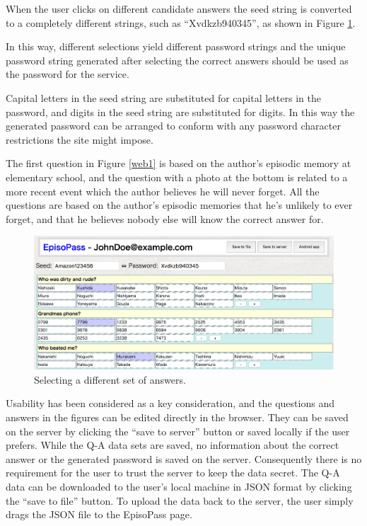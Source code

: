 \documentclass[runningheads,a4paper]{llncs}
\begin{document}
When the user clicks on different candidate answers 
the seed string is converted to a completely different strings, such as
``\textsf{Xvdkzb940345}'', as shown in Figure \ref{web11}.

In this way, different selections yield different password strings and
the unique password string generated after selecting the correct answers should be
used as the password for the service.

Capital letters in the seed string are substituted for capital letters in the password,
and digits in the seed string are substituted for digits. In this way
the generated password can be arranged to conform with any password character restrictions
the site might impose.

The first question in Figure \ref{web1}
is based on the author's episodic memory at elementary school,
and the question with a photo at the bottom is related to a more recent event
which the author believes he will never forget.
All the questions are based on the author's episodic memories that he's unlikely to ever forget,
and that he believes nobody else will know the correct answer for.

\begin{figure}
\centering
\includegraphics[width=1.0\columnwidth]{figures/8447eaba1ede0f678b3ce6fea63681f3}
\caption{Selecting a different set of answers.}
\label{web11}
\end{figure}

Usability has been considered as a key consideration, and the questions 
and answers in the figures can be edited directly in the browser. They can be
saved on the server by clicking the ``save to server'' button or saved locally
if the user prefers.
While the Q-A data sets are saved, no information about the correct answer or the
generated password is saved on the server. Consequently there is no requirement for the user
to trust the server to keep the data secret.
The Q-A data can be downloaded to the user's local machine in JSON format 
by clicking the ``save to file'' button. To upload the data back to the server, the user
simply drags the JSON file to the EpisoPass page.
\end{document}
